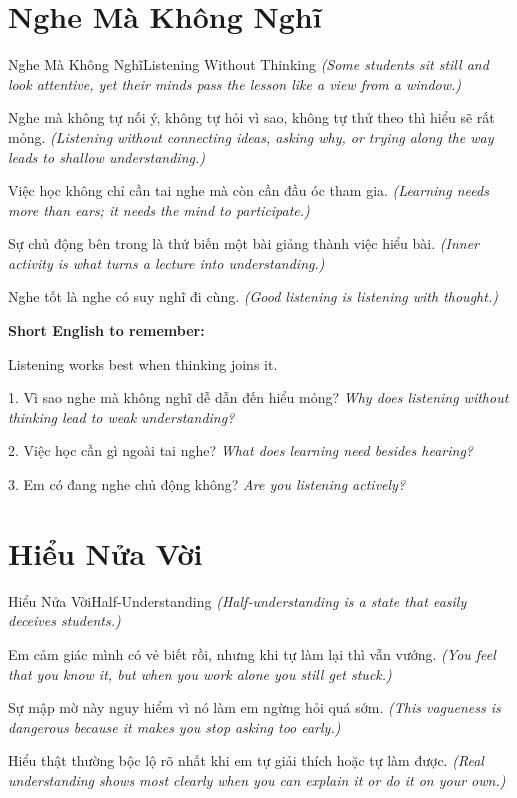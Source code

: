 \section{Nghe Mà Không Nghĩ}
\begin{truyen}{Nghe Mà Không Nghĩ}{Listening Without Thinking}
\textit{(Some students sit still and look attentive, yet their minds pass the lesson like a view from a window.)}

Nghe mà không tự nối ý, không tự hỏi vì sao, không tự thử theo thì hiểu sẽ rất mỏng.
\textit{(Listening without connecting ideas, asking why, or trying along the way leads to shallow understanding.)}

Việc học không chỉ cần tai nghe mà còn cần đầu óc tham gia.
\textit{(Learning needs more than ears; it needs the mind to participate.)}

Sự chủ động bên trong là thứ biến một bài giảng thành việc hiểu bài.
\textit{(Inner activity is what turns a lecture into understanding.)}
\end{truyen}

\begin{baihoc}
Nghe tốt là nghe có suy nghĩ đi cùng.
\textit{(Good listening is listening with thought.)}
\end{baihoc}

\begin{ghinhoanh}
\textbf{Short English to remember:}

Listening works best when thinking joins it.

\end{ghinhoanh}

\begin{tuhocnhanh}
1. Vì sao nghe mà không nghĩ dễ dẫn đến hiểu mỏng? \textit{Why does listening without thinking lead to weak understanding?}

2. Việc học cần gì ngoài tai nghe? \textit{What does learning need besides hearing?}

3. Em có đang nghe chủ động không? \textit{Are you listening actively?}
\end{tuhocnhanh}
\ngancach

\section{Hiểu Nửa Vời}
\begin{truyen}{Hiểu Nửa Vời}{Half-Understanding}
\textit{(Half-understanding is a state that easily deceives students.)}

Em cảm giác mình có vẻ biết rồi, nhưng khi tự làm lại thì vẫn vướng.
\textit{(You feel that you know it, but when you work alone you still get stuck.)}

Sự mập mờ này nguy hiểm vì nó làm em ngừng hỏi quá sớm.
\textit{(This vagueness is dangerous because it makes you stop asking too early.)}

Hiểu thật thường bộc lộ rõ nhất khi em tự giải thích hoặc tự làm được.
\textit{(Real understanding shows most clearly when you can explain it or do it on your own.)}
\end{truyen}

